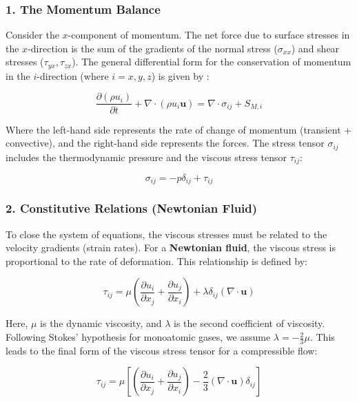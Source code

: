 \subsubsection*{1. The Momentum Balance}
Consider the $x$-component of momentum. The net force due to surface stresses in the $x$-direction is the sum of the gradients of the normal stress ($\sigma_{xx}$) and shear stresses ($\tau_{yx}, \tau_{zx}$). The general differential form for the conservation of momentum in the $i$-direction (where $i=x,y,z$) is given by \cite{versteeg2007cfd}:

\begin{equation}
    \frac{\partial (\rho u_i)}{\partial t} + \nabla \cdot (\rho u_i \mathbf{u}) = \nabla \cdot \sigma_{ij} + S_{M,i}
\end{equation}

Where the left-hand side represents the rate of change of momentum (transient + convective), and the right-hand side represents the forces. The stress tensor $\sigma_{ij}$ includes the thermodynamic pressure and the viscous stress tensor $\tau_{ij}$:

\begin{equation}
    \sigma_{ij} = -p \delta_{ij} + \tau_{ij}
\end{equation}

\subsubsection*{2. Constitutive Relations (Newtonian Fluid)}
To close the system of equations, the viscous stresses must be related to the velocity gradients (strain rates). For a \textbf{Newtonian fluid}, the viscous stress is proportional to the rate of deformation. This relationship is defined by:

\begin{equation}
    \tau_{ij} = \mu \left( \frac{\partial u_i}{\partial x_j} + \frac{\partial u_j}{\partial x_i} \right) + \lambda \delta_{ij} (\nabla \cdot \mathbf{u})
\end{equation}

Here, $\mu$ is the dynamic viscosity, and $\lambda$ is the second coefficient of viscosity. Following Stokes' hypothesis for monoatomic gases, we assume $\lambda = -\frac{2}{3}\mu$. This leads to the final form of the viscous stress tensor for a compressible flow:

\begin{equation}
    \tau_{ij} = \mu \left[ \left( \frac{\partial u_i}{\partial x_j} + \frac{\partial u_j}{\partial x_i} \right) - \frac{2}{3} (\nabla \cdot \mathbf{u}) \delta_{ij} \right]
\end{equation}

